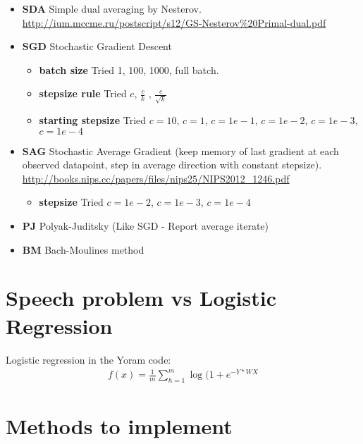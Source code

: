 \documentclass{article}
\begin{document}
\begin{itemize}
\item \textbf{SDA} Simple dual averaging by Nesterov. \url{http://ium.mccme.ru/postscript/s12/GS-Nesterov%20Primal-dual.pdf} \\
\item \textbf{SGD} Stochastic Gradient Descent \\
\begin{itemize}
\item \textbf{batch size} Tried 1, 100, 1000, full batch. \\
\item \textbf{stepsize rule} Tried $c$, $ \frac{c}{k}$ , $\frac{c}{\sqrt{k}}$ \\
\item \textbf{starting stepsize} Tried $c=10$, $c=1$, $c=1e-1$, $c=1e-2$, $c=1e-3$, $c=1e-4$ \\
\end{itemize}
\item \textbf{SAG} Stochastic Average Gradient (keep memory of last gradient at each observed datapoint, step in average direction with constant stepsize). \url{http://books.nips.cc/papers/files/nips25/NIPS2012_1246.pdf}\\
\begin{itemize}
\item \textbf{stepsize} Tried  $c=1e-2$, $c=1e-3$, $c=1e-4$ \\
\end{itemize}
\item \textbf{PJ} Polyak-Juditsky (Like SGD - Report average iterate)\\
\item \textbf{BM} Bach-Moulines method\\
\end{itemize}


\section*{Speech problem vs Logistic Regression}

Logistic regression in the Yoram code:
\begin{align*}
f(x) =\frac{1}{m}\sum_{h=1}^m \log(1 + e^{-Y * W X}  
\end{align*}


\section*{Methods to implement}
\end{document}
